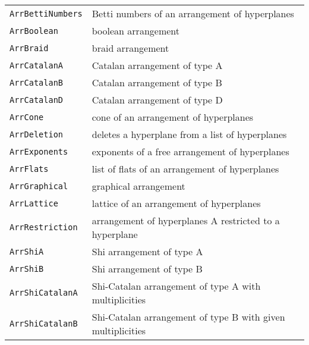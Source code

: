 \documentclass[a4paper]{mybook}
\begin{document}
\begin{center}
\begin{longtable}{ll}
   
{\verb~ArrBettiNumbers~} &
      Betti numbers of an arrangement of hyperplanes\\
   
{\verb~ArrBoolean~} &
      boolean arrangement\\
   
{\verb~ArrBraid~} &
      braid arrangement\\
   
{\verb~ArrCatalanA~} &
      Catalan arrangement of type A\\
   
{\verb~ArrCatalanB~} &
      Catalan arrangement of type B\\
   
{\verb~ArrCatalanD~} &
      Catalan arrangement of type D\\
   
{\verb~ArrCone~} &
      cone of an arrangement of hyperplanes\\
   
{\verb~ArrDeletion~} &
      deletes a hyperplane from a list of hyperplanes\\
   
{\verb~ArrExponents~} &
      exponents of a free arrangement of hyperplanes\\
   
{\verb~ArrFlats~} &
      list of flats of an arrangement of hyperplanes\\
   
{\verb~ArrGraphical~} &
      graphical arrangement\\
   
{\verb~ArrLattice~} &
      lattice of an arrangement of hyperplanes\\
   
{\verb~ArrRestriction~} &
      arrangement of hyperplanes A restricted to a hyperplane\\
   
{\verb~ArrShiA~} &
      Shi arrangement of type A\\
   
{\verb~ArrShiB~} &
      Shi arrangement of type B\\
   
{\verb~ArrShiCatalanA~} &
      Shi-Catalan arrangement of type A with multiplicities\\
   
{\verb~ArrShiCatalanB~} &
      Shi-Catalan arrangement of type B with given multiplicities\\
   

\end{longtable}
\end{center}
\end{document}
